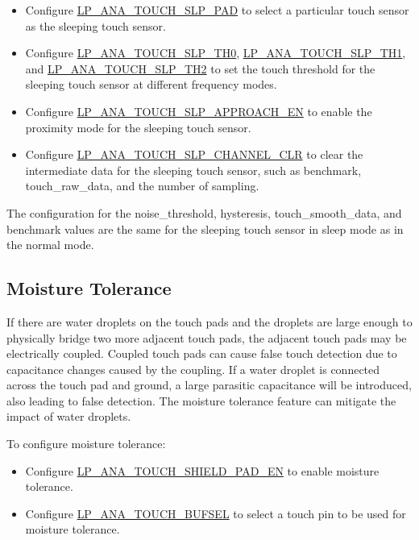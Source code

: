 \documentclass[main\_\_EN.tex]{subfiles}
\begin{document}
\begin{itemize}
    \item Configure \hyperref[fielddesc:LPANATOUCHSLPPAD]{LP\_ANA\_TOUCH\_SLP\_PAD} to select a particular touch sensor as the sleeping touch sensor.
    \item Configure \hyperref[fielddesc:LPANATOUCHSLPTH0]{LP\_ANA\_TOUCH\_SLP\_TH0}, \hyperref[fielddesc:LPANATOUCHSLPTH0]{LP\_ANA\_TOUCH\_SLP\_TH1}, and \hyperref[fielddesc:LPANATOUCHSLPTH0]{LP\_ANA\_TOUCH\_SLP\_TH2} to set the touch threshold for the sleeping touch sensor at different frequency modes.
    \item Configure \hyperref[fielddesc:LPANATOUCHSLPAPPROACHEN]{LP\_ANA\_TOUCH\_SLP\_APPROACH\_EN} to enable the proximity mode for the sleeping touch sensor.
    \item Configure \hyperref[fielddesc:LPANATOUCHSLPCHANNELCLR]{LP\_ANA\_TOUCH\_SLP\_CHANNEL\_CLR} to clear the intermediate data for the sleeping touch sensor, such as benchmark, touch\_raw\_data, and the number of sampling.
\end{itemize}

\begin{tiplisting}
The configuration for the noise\_threshold, hysteresis, touch\_smooth\_data, and benchmark values are the same for the sleeping touch sensor in sleep mode as in the normal mode.
\end{tiplisting}

\subsection{Moisture Tolerance}

If there are water droplets on the touch pads and the droplets are large enough to physically bridge two more adjacent touch pads, the adjacent touch pads may be electrically coupled. Coupled touch pads can cause false touch detection due to capacitance changes caused by the coupling. If a water droplet is connected across the touch pad and ground, a large parasitic capacitance will be introduced, also leading to false detection. The moisture tolerance feature can mitigate the impact of water droplets.

To configure moisture tolerance:

\begin{itemize}
    \item Configure \hyperref[fielddesc:LPANATOUCHSHIELDPADEN]{LP\_ANA\_TOUCH\_SHIELD\_PAD\_EN} to enable moisture tolerance.
    \item Configure \hyperref[fielddesc:LPANATOUCHBUFSEL]{LP\_ANA\_TOUCH\_BUFSEL} to select a touch pin to be used for moisture tolerance.
\end{itemize}
\end{document}
